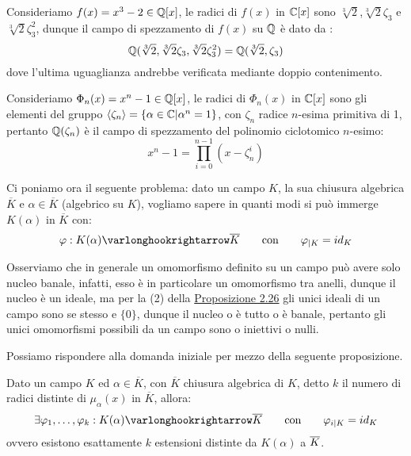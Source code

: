 \documentclass[11pt]{scrartcl}
\begin{document}
\begin{example}
    Consideriamo $f(x) = x^3 - 2 \in \mathbb Q[x]$, le radici di $f(x)$ in $\mathbb C[x]$ sono $\sqrt[3]{2}$,$\sqrt[3]{2}\zeta_3$ e $\sqrt[3]{2}\zeta_3^2$, dunque il campo di spezzamento di $f(x)$ su $\mathbb Q$ è dato da :
    \[ \mathbb Q(\sqrt[3]{2},\sqrt[3]{2}\zeta_3,\sqrt[3]{2}\zeta_3^2) = \mathbb Q(\sqrt[3]{2},\zeta_3)
        \]
    dove l'ultima uguaglianza andrebbe verificata mediante doppio contenimento.
\end{example}

\begin{example}
    Consideriamo $\Phi_n(x) = x^n - 1 \in \mathbb Q[x]$, le radici di $\Phi_n(x)$ in $\mathbb C[x]$ sono gli elementi del gruppo $\left<\zeta_n\right> = \{\alpha \in \mathbb C | \alpha^n = 1\}$, con $\zeta_n$ radice $n$-esima primitiva di 1,
    pertanto $\mathbb Q(\zeta_n)$ è il campo di spezzamento del polinomio ciclotomico $n$-esimo:
    \[ x^n - 1 = \prod_{i = 0}^{n-1} (x - \zeta_n^i)
        \]
\end{example}

Ci poniamo ora il seguente problema: dato un campo $K$, la sua chiusura algebrica $\overline K$ e $\alpha \in \overline K$ (algebrico su $K$), vogliamo sapere in quanti modi si può immerge $K(\alpha)$ in $\overline K$ con:
\[ \varphi : K(\alpha) \varlonghookrightarrow \overline K \qquad \text{con} \qquad \varphi_{|K} = id_K
    \]

\begin{remark}
    \label{3.32}
Osserviamo che in generale un omomorfismo definito su un campo può avere solo nucleo banale, infatti, esso è in particolare un omomorfismo tra anelli, dunque il nucleo è un ideale, ma per la (2) della \hyperref[2.26]{Proposizione 2.26} gli unici ideali di un campo 
sono se stesso e $\{0\}$, dunque il nucleo o è tutto o è banale, pertanto gli unici omomorfismi possibili da un campo sono o iniettivi o nulli.    
\end{remark}

Possiamo rispondere alla domanda iniziale per mezzo della seguente proposizione.

\begin{proposition}
    \label{3.33}
    Dato un campo $K$ ed $\alpha \in \overline K$, con $\overline K$ chiusura algebrica di $K$, detto $k$ il numero di radici distinte di $\mu_\alpha(x)$ in $\overline K$, allora:
    \[ \exists \varphi_1,\ldots,\varphi_k : K(\alpha) \varlonghookrightarrow \overline K \qquad \text{con} \qquad \varphi_{i|K} = id_K
        \]
    ovvero esistono esattamente $k$ estensioni distinte da $K(\alpha)$ a $\overline K$.
\end{proposition}
\end{document}

